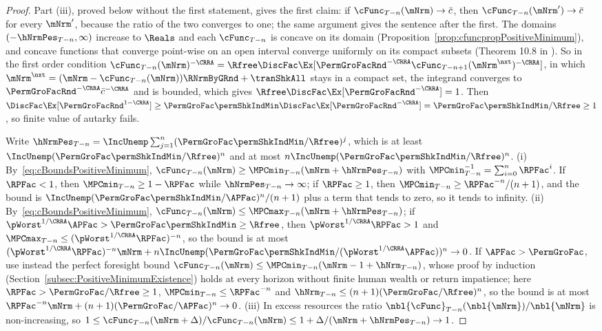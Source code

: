 \documentclass[\econtexRoot/BufferStockTheory]{subfiles}
\begin{document}
\begin{proof}
Part (iii), proved below without the first statement, gives the first claim: if $\cFunc_{T-n}(\mNrm)\rightarrow\bar{c}$, then $\cFunc_{T-n}(\mNrm^{\prime})\rightarrow\bar{c}$ for every $\mNrm^{\prime}$, because the ratio of the two converges to one; the same argument gives the sentence after the first.
The domains $(-\hNrmPes_{T-n},\infty)$ increase to $\Reals$ and each $\cFunc_{T-n}$ is concave on its domain (Proposition~\ref{prop:cfuncpropPositiveMinimum}), and concave functions that converge point-wise on an open interval converge uniformly on its compact subsets (Theorem 10.8 in \cite{Rockafellar1972}).
So in the first order condition $\cFunc_{T-n}(\mNrm)^{-\CRRA}=\Rfree\DiscFac\Ex[\PermGroFacRnd^{-\CRRA}\cFunc_{T-n+1}(\mNrm^{\nxt})^{-\CRRA}]$, in which $\mNrm^{\nxt}=(\mNrm-\cFunc_{T-n}(\mNrm))\RNrmByGRnd+\tranShkAll$ stays in a compact set, the integrand converges to $\PermGroFacRnd^{-\CRRA}\bar{c}^{-\CRRA}$ and is bounded, which gives $\Rfree\DiscFac\Ex[\PermGroFacRnd^{-\CRRA}]=1$.
Then $\DiscFac\Ex[\PermGroFacRnd^{1-\CRRA}]\geq\PermGroFac\permShkIndMin\DiscFac\Ex[\PermGroFacRnd^{-\CRRA}]=\PermGroFac\permShkIndMin/\Rfree\geq 1$, so finite value of autarky fails.

Write $\hNrmPes_{T-n}=\IncUnemp\sum_{j=1}^{n}(\PermGroFac\permShkIndMin/\Rfree)^{j}$, which is at least $\IncUnemp(\PermGroFac\permShkIndMin/\Rfree)^{n}$ and at most $n\IncUnemp(\PermGroFac\permShkIndMin/\Rfree)^{n}$.
(i) By~\eqref{eq:cBoundsPositiveMinimum}, $\cFunc_{T-n}(\mNrm)\geq\MPCmin_{T-n}(\mNrm+\hNrmPes_{T-n})$ with $\MPCmin_{T-n}^{-1}=\sum_{i=0}^{n}\RPFac^{i}$.
If $\RPFac<1$, then $\MPCmin_{T-n}\geq 1-\RPFac$ while $\hNrmPes_{T-n}\rightarrow\infty$; if $\RPFac\geq 1$, then $\MPCmin_{T-n}\geq\RPFac^{-n}/(n+1)$, and the bound is $\IncUnemp(\PermGroFac\permShkIndMin/\APFac)^{n}/(n+1)$ plus a term that tends to zero, so it tends to infinity.
(ii) By~\eqref{eq:cBoundsPositiveMinimum}, $\cFunc_{T-n}(\mNrm)\leq\MPCmax_{T-n}(\mNrm+\hNrmPes_{T-n})$; if $\pWorst^{1/\CRRA}\APFac>\PermGroFac\permShkIndMin\geq\Rfree$, then $\pWorst^{1/\CRRA}\RPFac>1$ and $\MPCmax_{T-n}\leq(\pWorst^{1/\CRRA}\RPFac)^{-n}$, so the bound is at most $(\pWorst^{1/\CRRA}\RPFac)^{-n}\mNrm+n\IncUnemp(\PermGroFac\permShkIndMin/(\pWorst^{1/\CRRA}\APFac))^{n}\rightarrow 0$.
If $\APFac>\PermGroFac$, use instead the perfect foresight bound $\cFunc_{T-n}(\mNrm)\leq\MPCmin_{T-n}(\mNrm-1+\hNrm_{T-n})$, whose proof by induction (Section~\ref{subsec:PositiveMinimumExistence}) holds at every horizon without finite human wealth or return impatience; here $\RPFac>\PermGroFac/\Rfree\geq 1$, $\MPCmin_{T-n}\leq\RPFac^{-n}$ and $\hNrm_{T-n}\leq(n+1)(\PermGroFac/\Rfree)^{n}$, so the bound is at most $\RPFac^{-n}\mNrm+(n+1)(\PermGroFac/\APFac)^{n}\rightarrow 0$.
(iii) In excess resources the ratio $\nbl{\cFunc}_{T-n}(\nbl{\mNrm})/\nbl{\mNrm}$ is non-increasing, so $1\leq\cFunc_{T-n}(\mNrm+\Delta)/\cFunc_{T-n}(\mNrm)\leq 1+\Delta/(\mNrm+\hNrmPes_{T-n})\rightarrow 1$.
\end{proof}
\end{document}
